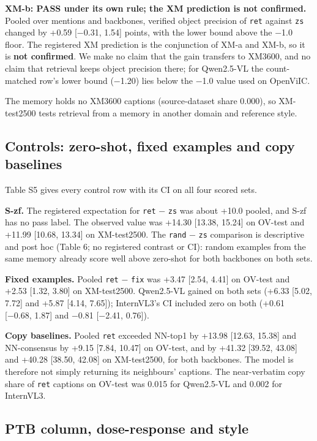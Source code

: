 \textbf{XM-b: PASS under its own rule; the XM prediction is not confirmed.} Pooled over mentions and
backbones, verified object precision of \texttt{ret} against \texttt{zs} changed by +0.59 {[}−0.31,
1.54{]} points, with the lower bound above the −1.0 floor. The registered XM prediction is the
conjunction of XM-a and XM-b, so it is \textbf{not confirmed}. We make no claim that the gain
transfers to XM3600, and no claim that retrieval keeps object precision there; for Qwen2.5-VL the
count-matched row's lower bound (−1.20) lies below the −1.0 value used on OpenViIC.

The memory holds no XM3600 captions (source-dataset share 0.000), so XM-test2500 tests retrieval
from a memory in another domain and reference style.

\subsection{Controls: zero-shot, fixed examples and copy
baselines}\label{controls-zero-shot-fixed-examples-and-copy-baselines}

Table S5 gives every control row with its CI on all four scored sets.

\textbf{S-zf.} The registered expectation for \texttt{ret} − \texttt{zs} was about +10.0 pooled, and
S-zf has no pass label. The observed value was +14.30 {[}13.38, 15.24{]} on OV-test and +11.99
{[}10.68, 13.34{]} on XM-test2500. The \texttt{rand} − \texttt{zs} comparison is descriptive and
post hoc (Table 6; no registered contrast or CI): random examples from the same memory already score
well above zero-shot for both backbones on both sets.

\textbf{Fixed examples.} Pooled \texttt{ret} − \texttt{fix} was +3.47 {[}2.54, 4.41{]} on OV-test
and +2.53 {[}1.32, 3.80{]} on XM-test2500. Qwen2.5-VL gained on both sets (+6.33 {[}5.02, 7.72{]}
and +5.87 {[}4.14, 7.65{]}); InternVL3's CI included zero on both (+0.61 {[}−0.68, 1.87{]} and −0.81
{[}−2.41, 0.76{]}).

\textbf{Copy baselines.} Pooled \texttt{ret} exceeded NN-top1 by +13.98 {[}12.63, 15.38{]} and
NN-consensus by +9.15 {[}7.84, 10.47{]} on OV-test, and by +41.32 {[}39.52, 43.08{]} and +40.28
{[}38.50, 42.08{]} on XM-test2500, for both backbones. The model is therefore not simply returning
its neighbours' captions. The near-verbatim copy share of \texttt{ret} captions on OV-test was 0.015
for Qwen2.5-VL and 0.002 for InternVL3.

\subsection{PTB column, dose-response and style}\label{ptb-column-dose-response-and-style}

